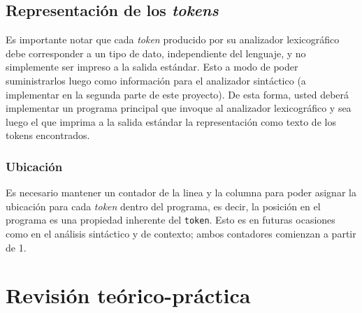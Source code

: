 \documentclass[letterpaper,10pt]{article}
\begin{document}
\subsection{Representación de los \textit{tokens}}

Es importante notar que cada \textit{token} producido por su analizador lexicográfico debe corresponder a un tipo de dato, independiente del lenguaje, y no simplemente ser impreso a la salida estándar. Esto a modo de poder suministrarlos luego como información para el analizador sintáctico (a implementar en la segunda parte de este proyecto). De esta forma, usted deberá implementar un programa principal que invoque al analizador lexicográfico y sea luego el que imprima a la salida estándar la representación como texto de los tokens encontrados.

\subsubsection{Ubicación}

Es necesario mantener un contador de la linea y la columna para poder asignar la ubicación para cada \textit{token} dentro del programa, es decir, la posición en el programa es una propiedad inherente del \texttt{token}. Esto es en futuras ocasiones como en el análisis sintáctico y de contexto; ambos contadores comienzan a partir de 1.

\section{Revisión teórico-práctica}
\end{document}
